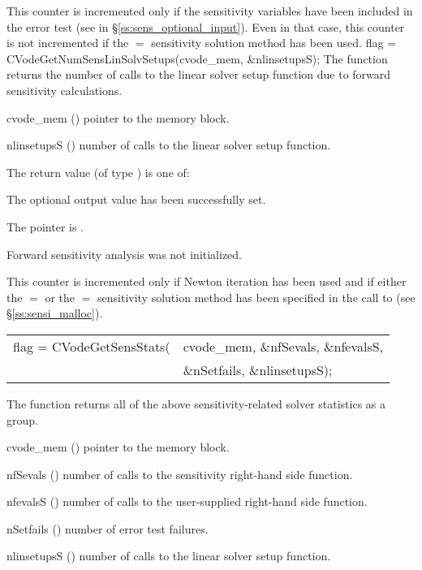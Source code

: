{
  This counter is incremented only if the sensitivity variables have been included
  in the error test (see  in \S\ref{ss:sens_optional_input}). 
  Even in that case, this counter is not incremented if the $=$ 
  sensitivity solution method has been used.
}
{
  flag = CVodeGetNumSensLinSolvSetups(cvode\_mem, \&nlinsetupsS);
}
{
  The function  returns the number of calls
  to the linear solver setup function due to forward sensitivity calculations.
}
{
  \begin{args}
  \item[cvode\_mem] ()
    pointer to the {\cvodes} memory block.
  \item[nlinsetupsS] ()
    number of calls to the linear solver setup function.
  \end{args}
}
{
  The return value  (of type ) is one of:
  \begin{args}
  \item[\Id{CV\_SUCCESS}] 
    The optional output value has been successfully set.
  \item[\Id{CV\_MEM\_NULL}]
    The  pointer is .
  \item[\Id{CV\_NO\_SENS}]
    Forward sensitivity analysis was not initialized.
  \end{args}
}
{
  This counter is incremented only if Newton iteration has been used and if
  either the $=$ or the $=$ sensitivity
  solution method has been specified in the call to 
  (see \S\ref{ss:sensi_malloc}).
}
{
  \begin{tabular}[t]{@{}r@{}l@{}}
    flag = CVodeGetSensStats(&cvode\_mem, \&nfSevals, \&nfevalsS, \\
                             &\&nSetfails, \&nlinsetupsS);
  \end{tabular}
}
{
  The function  returns all of the above sensitivity-related solver
  statistics as a group.
}
{
  \begin{args}
  \item[cvode\_mem] ()
    pointer to the {\cvodes} memory block.
  \item[nfSevals] ()
    number of calls to the sensitivity right-hand side function.
  \item[nfevalsS] ()
    number of calls to the user-supplied right-hand side function.
  \item[nSetfails] ()
    number of error test failures.
  \item[nlinsetupsS] ()
    number of calls to the linear solver setup function.
  \end{args}
}
